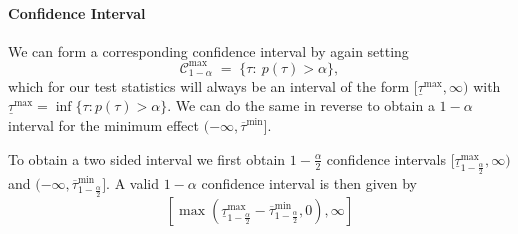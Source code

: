 \documentclass[11pt]{exam}
\theoremstyle{plain}
\begin{document}
\paragraph{Confidence Interval}
We can form a corresponding confidence interval by again setting
\[
\mathcal C^{\max}_{1-\alpha} \;=\; \{\tau:\ p(\tau) > \alpha\},
\]
which for our test statistics will always be an interval of the form $[\underline\tau^{\max}, \infty)$ with $\underline\tau^{\max} = \inf\{\tau: p(\tau) > \alpha \}$. We can do the same in reverse to obtain a $1-\alpha$ interval for the minimum effect $(-\infty, \overline\tau^{\min}]$.

To obtain a two sided interval we first obtain $1-\frac{\alpha}{2}$ confidence intervals $[\underline\tau_{1-\frac{\alpha}{2}}^{\max}, \infty)$ and $(-\infty, \overline\tau_{1-\frac{\alpha}{2}}^{\min}]$. A valid $1-\alpha$ confidence interval is then given by
\[
    [\max(\underline\tau_{1-\frac{\alpha}{2}}^{\max} -  \overline\tau_{1-\frac{\alpha}{2}}^{\min}, 0), \infty]
\]
\end{document}
